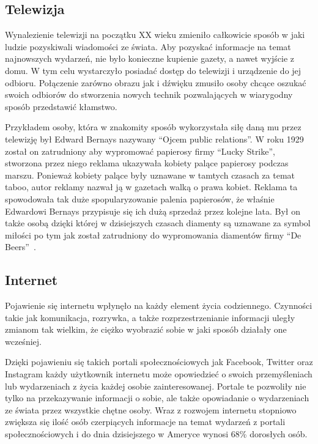 \subsection{Telewizja}
Wynalezienie telewizji na początku XX wieku zmieniło całkowicie sposób w jaki ludzie pozyskiwali wiadomości ze świata.
Aby pozyskać informacje na temat najnowszych wydarzeń, nie było konieczne kupienie gazety, a nawet 
wyjście z domu. W tym celu wystarczyło posiadać dostęp do telewizji i urządzenie do jej odbioru. Połączenie zarówno obrazu
jak i dźwięku zmusiło osoby chcące oszukać swoich odbiorów do stworzenia nowych technik 
pozwalających w wiarygodny sposób przedstawić kłamstwo.

Przykładem osoby, która w znakomity sposób wykorzystała siłę daną mu przez telewizję był Edward Bernays
nazywany ``Ojcem public relations''.
W roku 1929 został on zatrudniony aby wypromować papierosy firmy ``Lucky Strike'',
stworzona przez niego reklama ukazywała kobiety palące papierosy podczas marszu. 
Ponieważ kobiety palące były uznawane w tamtych czasach za temat
taboo, autor reklamy nazwał ją w gazetach walką o prawa kobiet. Reklama ta spowodowała tak duże 
spopularyzowanie palenia papierosów, że właśnie Edwardowi Bernays przypisuje się
ich dużą sprzedaż przez kolejne lata.
Był on także osobą dzięki której w dzisiejszych czasach diamenty są uznawane za symbol miłości po tym jak
został zatrudniony do wypromowania diamentów firmy ``De Beers''~\cite{MarkDice}.

\subsection{Internet}
Pojawienie się internetu wpłynęło na każdy element życia codziennego. Czynności takie jak komunikacja, rozrywka,
a także rozprzestrzenianie informacji uległy zmianom tak wielkim, że ciężko wyobrazić sobie w jaki sposób działały
one wcześniej. 

Dzięki pojawieniu się takich portali społecznościowych jak Facebook, Twitter oraz Instagram każdy użytkownik
internetu może opowiedzieć o swoich przemyśleniach lub wydarzeniach z życia każdej osobie zainteresowanej. Portale te
pozwoliły nie tylko na przekazywanie informacji o sobie, ale także opowiadanie o wydarzeniach ze świata przez wszystkie
chętne osoby. Wraz z rozwojem internetu stopniowo zwiększa się ilość osób czerpiących informacje na temat wydarzeń
z portali społecznościowych i do dnia dzisiejszego w Ameryce wynosi 68\% dorosłych osób. 

